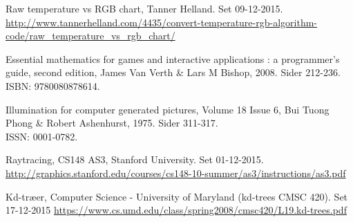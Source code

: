 \begin{thebibliography}{99}
  Raw temperature vs RGB chart,
  Tanner Helland. 
  Set 09-12-2015.\\
  \url{http://www.tannerhelland.com/4435/convert-temperature-rgb-algorithm-code/raw_temperature_vs_rgb_chart/}

  Essential mathematics for games and interactive applications : a programmer's guide, second edition, James Van Verth \& Lars M   Bishop, 2008. Sider 212-236.\\
  ISBN: 9780080878614.
  
  Illumination for computer generated pictures, Volume 18 Issue 6, Bui Tuong Phong \& Robert Ashenhurst, 1975. Sider 311-317. \\
  ISSN: 0001-0782.

  Raytracing, 
  CS148 AS3, Stanford University. 
  Set 01-12-2015.\\
  \url{http://graphics.stanford.edu/courses/cs148-10-summer/as3/instructions/as3.pdf}
  

  Kd-træer,
  Computer Science - University of Maryland (kd-trees CMSC 420).
  Set 17-12-2015
  \url{https://www.cs.umd.edu/class/spring2008/cmsc420/L19.kd-trees.pdf}
  
\end{thebibliography}
\clearpage